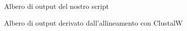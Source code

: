 \documentclass[11pt,italian]{article}
\begin{document}
\newpage
\begin{figure}[H]
  \caption{Albero di output del nostro script}
  \label{fig:script-tree}
\end{figure}
\begin{figure}[H]
  \caption{Albero di output derivato dall'allineamento con ClustalW}
  \label{fig:tool-tree}
\end{figure}
\end{document}
